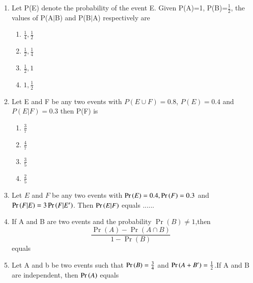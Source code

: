 \begin{enumerate}[label=\thesection.\arabic*.,ref=\thesection.\theenumi]
\item Let P(E) denote the probability of the event E. Given P(A)=1, P(B)=$\frac{1}{2}$, the values of P(A$|$B) and P(B$|$A) respectively are
%
\begin{enumerate}
    \item $\frac{1}{4},\frac{1}{2}$
    \item $\frac{1}{2},\frac{1}{4}$
    \item $\frac{1}{2},1$
    \item $1,\frac{1}{2}$
\end{enumerate}
%
\solution

%
%
\item Let E and F be any two events with $P(E \cup F) = 0.8$, $P(E) = 0.4$ and $P(E|F) = 0.3$ then P(F) is \newline
\begin{enumerate}
\item $\frac{3}{7}$ 
\item $\frac{4}{7}$ 
\item $\frac{3}{5}$ 
\item $\frac{2}{5}$ 
\end{enumerate}
%
\solution

  \item  Let $E$ and $F$ be any two events with $\Pr\left(E\right)=0.4, \Pr\left(F\right)=0.3$
and $\Pr\left(F|E\right)=3 \Pr\left(F|E'\right)$. Then $\Pr\left(E|F\right)$ equals ......
\\
  \solution
  
  \item If A and B are two events and the probability $\Pr(B) \neq 1$,then\\
  \begin{equation}
      \frac{\Pr(A)-\Pr(A \cap B)}{1-\Pr{(B)}}
  \end{equation}
  equals
  \begin{enumerate}
  \end{enumerate}
    \solution
    
%
\item Let A and b be two events such that $\Pr\left(B\right)=\frac{3}{4}$ and $\Pr\left(A + B^{\prime}\right)=\frac{1}{2}$.If A and B are independent, then $\Pr\left(A\right)$ equals

\end{enumerate}
